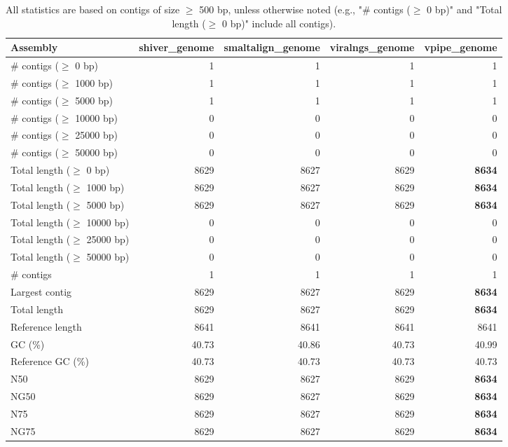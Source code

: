 \documentclass[12pt,a4paper]{article}
\begin{document}
\begin{table}[ht]
\begin{center}
\caption{All statistics are based on contigs of size $\geq$ 500 bp, unless otherwise noted (e.g., "\# contigs ($\geq$ 0 bp)" and "Total length ($\geq$ 0 bp)" include all contigs).}
\begin{tabular}{|l*{4}{|r}|}
\hline
Assembly & shiver\_genome & smaltalign\_genome & viralngs\_genome & vpipe\_genome \\ \hline
\# contigs ($\geq$ 0 bp) & 1 & 1 & 1 & 1 \\ \hline
\# contigs ($\geq$ 1000 bp) & 1 & 1 & 1 & 1 \\ \hline
\# contigs ($\geq$ 5000 bp) & 1 & 1 & 1 & 1 \\ \hline
\# contigs ($\geq$ 10000 bp) & 0 & 0 & 0 & 0 \\ \hline
\# contigs ($\geq$ 25000 bp) & 0 & 0 & 0 & 0 \\ \hline
\# contigs ($\geq$ 50000 bp) & 0 & 0 & 0 & 0 \\ \hline
Total length ($\geq$ 0 bp) & 8629 & 8627 & 8629 & {\bf 8634} \\ \hline
Total length ($\geq$ 1000 bp) & 8629 & 8627 & 8629 & {\bf 8634} \\ \hline
Total length ($\geq$ 5000 bp) & 8629 & 8627 & 8629 & {\bf 8634} \\ \hline
Total length ($\geq$ 10000 bp) & 0 & 0 & 0 & 0 \\ \hline
Total length ($\geq$ 25000 bp) & 0 & 0 & 0 & 0 \\ \hline
Total length ($\geq$ 50000 bp) & 0 & 0 & 0 & 0 \\ \hline
\# contigs & 1 & 1 & 1 & 1 \\ \hline
Largest contig & 8629 & 8627 & 8629 & {\bf 8634} \\ \hline
Total length & 8629 & 8627 & 8629 & {\bf 8634} \\ \hline
Reference length & 8641 & 8641 & 8641 & 8641 \\ \hline
GC (\%) & 40.73 & 40.86 & 40.73 & 40.99 \\ \hline
Reference GC (\%) & 40.73 & 40.73 & 40.73 & 40.73 \\ \hline
N50 & 8629 & 8627 & 8629 & {\bf 8634} \\ \hline
NG50 & 8629 & 8627 & 8629 & {\bf 8634} \\ \hline
N75 & 8629 & 8627 & 8629 & {\bf 8634} \\ \hline
NG75 & 8629 & 8627 & 8629 & {\bf 8634} \\ \hline

\end{tabular}
\end{center}
\end{table}
\end{document}
